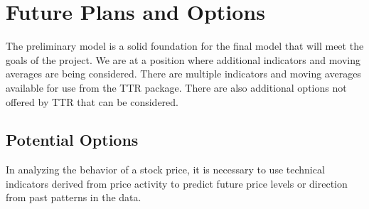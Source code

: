 \documentclass[11pt]{article}
\begin{document}
\section*{\hspace{-.5cm} Future Plans and Options}\label{FP}
The preliminary model is a solid foundation for the final model that will meet the goals of the project. We are at a position where additional indicators and moving averages are being considered. There are multiple indicators and moving averages available for use from the TTR package. There are also additional options not offered by TTR that can be considered.

\subsection*{Potential Options}\label{POp}
In analyzing the behavior of a stock price, it is necessary to use technical indicators derived from price activity to predict future price levels or direction from past patterns in the data.
\end{document}
